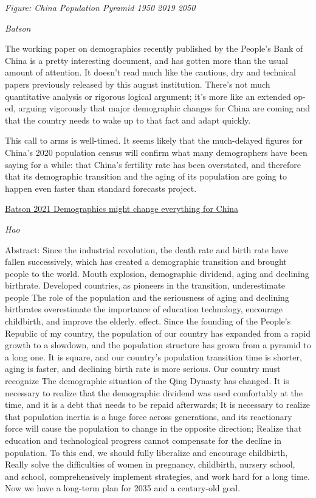 \documentclass[
]{book}
\begin{document}
\emph{Figure: China Population Pyramid 1950 2019 2050}

\emph{Batson}

The working paper on demographics recently published by the People's Bank of China is a pretty interesting document, and has gotten more than the usual amount of attention. It doesn't read much like the cautious, dry and technical papers previously released by this august institution. There's not much quantitative analysis or rigorous logical argument; it's more like an extended op-ed, arguing vigorously that major demographic changes for China are coming and that the country needs to wake up to that fact and adapt quickly.

This call to arms is well-timed. It seems likely that the much-delayed figures for China's 2020 population census will confirm what many demographers have been saying for a while: that China's fertility rate has been overstated, and therefore that its demographic transition and the aging of its population are going to happen even faster than standard forecasts project.

\href{https://andrewbatson.com/2021/04/28/demographics-might-change-everything-for-china-except-the-growth-model/}{Batson 2021 Demographics might change everything for China}

\emph{Hao}

Abstract: Since the industrial revolution, the death rate and birth rate have fallen successively, which has created a demographic transition and brought people to the world.
Mouth explosion, demographic dividend, aging and declining birthrate. Developed countries, as pioneers in the transition, underestimate people
The role of the population and the seriousness of aging and declining birthrates overestimate the importance of education technology, encourage childbirth, and improve the elderly.
effect. Since the founding of the People's Republic of my country, the population of our country has expanded from a rapid growth to a slowdown, and the population structure has grown from a pyramid to a long one.
It is square, and our country's population transition time is shorter, aging is faster, and declining birth rate is more serious. Our country must recognize
The demographic situation of the Qing Dynasty has changed. It is necessary to realize that the demographic dividend was used comfortably at the time, and it is a debt that needs to be repaid afterwards;
It is necessary to realize that population inertia is a huge force across generations, and its reactionary force will cause the population to change in the opposite direction;
Realize that education and technological progress cannot compensate for the decline in population. To this end, we should fully liberalize and encourage childbirth,
Really solve the difficulties of women in pregnancy, childbirth, nursery school, and school, comprehensively implement strategies, and work hard for a long time.
Now we have a long-term plan for 2035 and a century-old goal.
\end{document}
